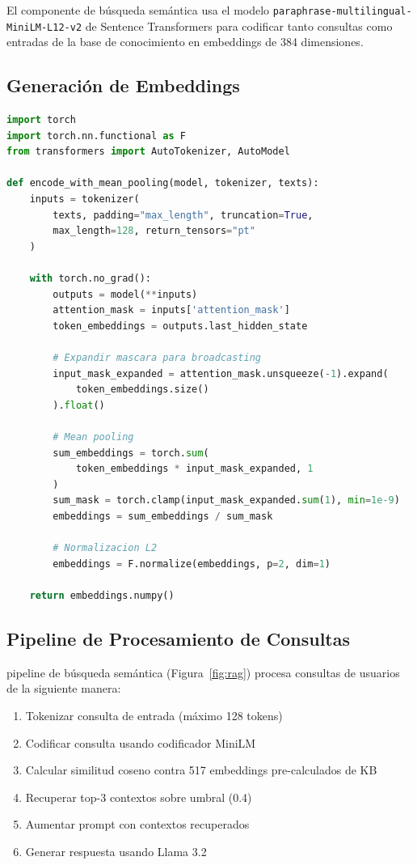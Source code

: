 \documentclass[11pt,a4paper]{article}
\begin{document}
El componente de búsqueda semántica usa el modelo \texttt{paraphrase-multilingual-MiniLM-L12-v2} de Sentence Transformers para codificar tanto consultas como entradas de la base de conocimiento en embeddings de 384 dimensiones.

\subsection{Generación de Embeddings}

\nopagebreak
\begin{lstlisting}[language=Python, caption={Mean pooling para embeddings de oraciones}]
import torch
import torch.nn.functional as F
from transformers import AutoTokenizer, AutoModel

def encode_with_mean_pooling(model, tokenizer, texts):
    inputs = tokenizer(
        texts, padding="max_length", truncation=True,
        max_length=128, return_tensors="pt"
    )
    
    with torch.no_grad():
        outputs = model(**inputs)
        attention_mask = inputs['attention_mask']
        token_embeddings = outputs.last_hidden_state
        
        # Expandir mascara para broadcasting
        input_mask_expanded = attention_mask.unsqueeze(-1).expand(
            token_embeddings.size()
        ).float()
        
        # Mean pooling
        sum_embeddings = torch.sum(
            token_embeddings * input_mask_expanded, 1
        )
        sum_mask = torch.clamp(input_mask_expanded.sum(1), min=1e-9)
        embeddings = sum_embeddings / sum_mask
        
        # Normalizacion L2
        embeddings = F.normalize(embeddings, p=2, dim=1)
    
    return embeddings.numpy()
\end{lstlisting}

\subsection{Pipeline de Procesamiento de Consultas}
\nopagebreakEl pipeline de búsqueda semántica (Figura~\ref{fig:rag}) procesa consultas de usuarios de la siguiente manera:

\begin{enumerate}
    \item Tokenizar consulta de entrada (máximo 128 tokens)
    \item Codificar consulta usando codificador MiniLM
    \item Calcular similitud coseno contra 517 embeddings pre-calculados de KB
    \item Recuperar top-3 contextos sobre umbral (0.4)
    \item Aumentar prompt con contextos recuperados
    \item Generar respuesta usando Llama 3.2
\end{enumerate}
\end{document}

